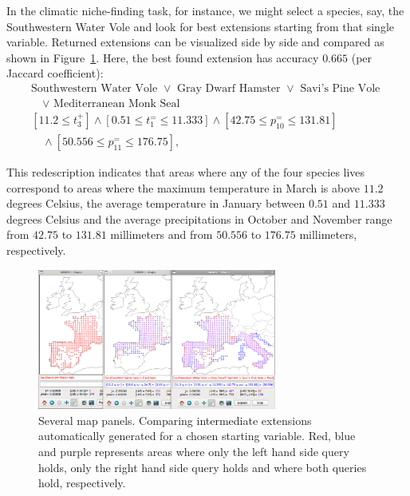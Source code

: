 \documentclass{llncs}
\begin{document}
In the climatic niche-finding task, for instance, we might select a
species, say, the Southwestern Water Vole and look for best extensions
starting from that single variable.  Returned extensions can be
visualized side by side and compared as shown in
Figure~\ref{fig:comparison}. Here, the best found extension has
accuracy $0.665$ (per Jaccard coefficient):
\begin{equation*}
\begin{array}{l}
\text{Southwestern Water Vole }\lor\text{ Gray Dwarf Hamster }\lor\text{ Savi's Pine Vole }\\[1mm]
\quad\lor\text{ Mediterranean Monk Seal}\\[3mm]
[11.2 \leq t_{3}^{+}] \land  [0.51 \leq t_{1}^{=} \leq 11.333]\land  [42.75 \leq p_{10}^{=} \leq 131.81] \\[1mm]
\quad\land [50.556 \leq p_{11}^{=} \leq 176.75],
\end{array}
\end{equation*}

This redescription indicates that areas where any of the four
species lives correspond to areas where the maximum temperature in
March is above $11.2$ degrees Celsius, the average temperature in January
between $0.51$ and $11.333$ degrees Celsius and the average precipitations in
October and November range from $42.75$ to $131.81$ millimeters and from $50.556$ to $176.75$ millimeters, respectively.



\begin{figure}
  \centering
\includegraphics[width=0.7\textwidth]{screenshots/comparison}
  \caption{Several map panels. Comparing intermediate extensions automatically generated for a chosen starting variable. Red, blue and purple represents areas where only the left hand side query holds, only the right hand side query holds and where both queries hold, respectively.}
  \label{fig:comparison}
\end{figure}
\end{document}
